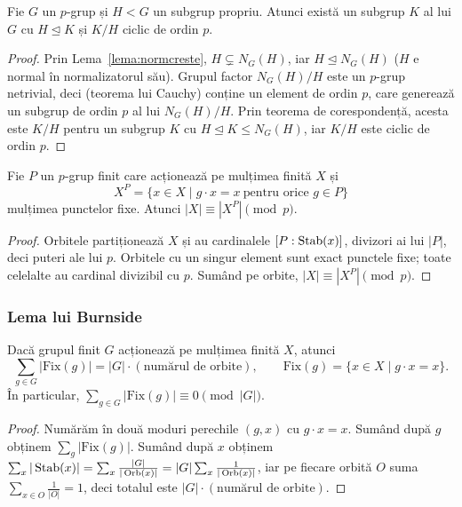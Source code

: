 \begin{propozitie}\label{prop:pchain}
Fie $G$ un $p$-grup și $H<G$ un subgrup propriu. Atunci există un subgrup $K$ al lui $G$ cu $H\trianglelefteq K$ și $K/H$ ciclic de ordin $p$.
\end{propozitie}
\begin{proof}
Prin Lema~\ref{lema:normcreste}, $H\subsetneq N_G(H)$, iar $H\trianglelefteq N_G(H)$ ($H$ e normal în normalizatorul său). Grupul factor $N_G(H)/H$ este un $p$-grup netrivial, deci (teorema lui Cauchy) conține un element de ordin $p$, care generează un subgrup de ordin $p$ al lui $N_G(H)/H$. Prin teorema de corespondență, acesta este $K/H$ pentru un subgrup $K$ cu $H\trianglelefteq K\le N_G(H)$, iar $K/H$ este ciclic de ordin $p$.
\end{proof}

\begin{lema}\label{lema:fix}
Fie $P$ un $p$-grup finit care acționează pe mulțimea finită $X$ și
\[
X^{P}=\{x\in X\mid g\cdot x=x\ \text{pentru orice }g\in P\}
\]
mulțimea punctelor fixe. Atunci $|X|\equiv|X^{P}|\pmod p$.
\end{lema}

\begin{proof}
Orbitele partiționează $X$ și au cardinalele $[P:\operatorname{Stab}(x)]$, divizori ai lui $|P|$, deci puteri ale lui $p$. Orbitele cu un singur element sunt exact punctele fixe; toate celelalte au cardinal divizibil cu $p$. Sumând pe orbite, $|X|\equiv|X^P|\pmod p$.
\end{proof}

\subsubsection*{Lema lui Burnside}

\begin{lema}\label{lema:burnside}
Dacă grupul finit $G$ acționează pe mulțimea finită $X$, atunci
\[
\sum_{g\in G}\bigl|\mathrm{Fix}(g)\bigr|=|G|\cdot(\text{numărul de orbite}),\qquad \mathrm{Fix}(g)=\{x\in X\mid g\cdot x=x\}.
\]
În particular, $\sum_{g\in G}|\mathrm{Fix}(g)|\equiv0\pmod{|G|}$.
\end{lema}

\begin{proof}
Numărăm în două moduri perechile $(g,x)$ cu $g\cdot x=x$. Sumând după $g$ obținem $\sum_g|\mathrm{Fix}(g)|$. Sumând după $x$ obținem $\sum_x|\operatorname{Stab}(x)|=\sum_x\frac{|G|}{|\operatorname{Orb}(x)|}=|G|\sum_x\frac1{|\operatorname{Orb}(x)|}$, iar pe fiecare orbită $O$ suma $\sum_{x\in O}\frac1{|O|}=1$, deci totalul este $|G|\cdot(\text{numărul de orbite})$.
\end{proof}

